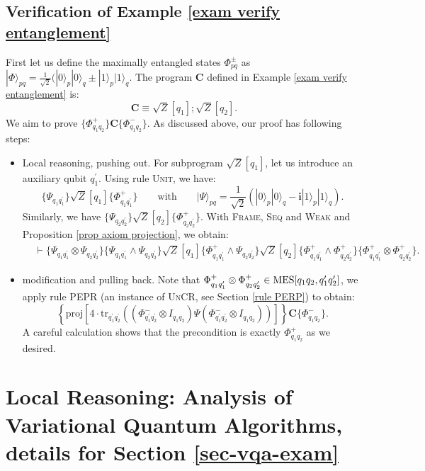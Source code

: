 \documentclass[conference,compsoc, 10pt]{IEEEtran}
\newcommand {\bi } {{\boldsymbol{i}}}
\newcommand {\id } {{I}}
\newcommand {\tr } {{\mathrm{tr}}}
\newcommand {\prog } {{\mathbf{C}}}
\def\>{\ensuremath{\rangle}}
\newcommand{\proj}{{\mathrm{proj}}}
\begin{document}
\begin{appendices}
		\subsection{Verification of Example \ref{exam verify entanglement}}
		\label{sec app sub verification exam verify entanglement}
		First let us define the maximally entangled states $\Phi^\pm_{pq}$ as $|\Phi\>_{pq} = \frac{1}{\sqrt{2}}(|0\>_p|0\>_q \pm |1\>_p|1\>_q$. The program $\prog$ defined in Example \ref{exam verify entanglement} is:
		$$\prog\equiv {\sqrt{Z}}[q_1]; {\sqrt{Z}}[q_2].$$
		We aim to prove $\{\Phi^+_{q_1q_2}\}\prog\{\Phi^-_{q_1q_2}\}$. As discussed above, our proof has following steps:
		\begin{itemize}
			\item Local reasoning, pushing out. For subprogram ${\sqrt{Z}}[q_1]$, let us introduce an auxiliary qubit $q_1^\prime$. Using rule \textsc{Unit}, we have:
			$$\{\Psi_{q_1q_1^\prime}\}{\sqrt{Z}}[q_1]\{\Phi^+_{q_1q_1^\prime}\}\qquad\text{with}\qquad |\Psi\>_{pq} = \frac{1}{\sqrt{2}}(|0\>_p|0\>_q - \bi |1\>_p|1\>_q).$$
			Similarly, we have $\{\Psi_{q_2q_2^\prime}\}{\sqrt{Z}}[q_2]\{\Phi^+_{q_2q_2^\prime}\}$. With \textsc{Frame}, \textsc{Seq} and \textsc{Weak} and Proposition \ref{prop axiom projection}, we obtain:
			\begin{align*}
			&\vdash\{\Psi_{q_1q_1^\prime}\otimes\Psi_{q_2q_2^\prime}\}\{\Psi_{q_1q_1^\prime}\wedge\Psi_{q_2q_2^\prime}\}{\sqrt{Z}}[q_1]\{\Phi^+_{q_1q_1^\prime}\wedge\Psi_{q_2q_2^\prime}\}{\sqrt{Z}}[q_2]\{\Phi^+_{q_1q_1^\prime}\wedge\Phi^+_{q_2q_2^\prime}\}\{\Phi^+_{q_1q_1^\prime}\otimes\Phi^+_{q_2q_2^\prime}\}.
			\end{align*}
			\item modification and pulling back. Note that $\Phi^+_{q_1q_1^\prime}\otimes\Phi^+_{q_2q_2^\prime}\in{\rm MES}[q_1q_2, q_1^\prime q_2^\prime]$, we apply rule \textsc{PEPR} (an instance of \textsc{UnCR}, see Section \ref{rule PERP}) to obtain:
			$$\left\{\proj\left[4\cdot\tr_{q_1^\prime q_2^\prime}\left((\Phi^-_{q_1^\prime q_2^\prime}\otimes\id_{q_1q_2})\Psi(\Phi^-_{q_1^\prime q_2^\prime}\otimes\id_{q_1q_2})\right)\right]\right\}\prog\{\Phi^-_{q_1q_2}\}.$$
			A careful calculation shows that the precondition is exactly $\Phi^+_{q_1q_2}$ as we desired.
		\end{itemize}
		
		\section{Local Reasoning: Analysis of Variational
			Quantum Algorithms, details for Section \ref{sec-vqa-exam}}
		\label{sec app vqa}
		

\end{appendices}
\end{document}
